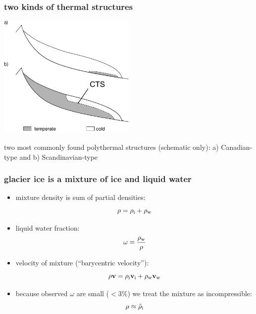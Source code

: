 \documentclass{beamer}
\begin{document}
\begin{frame}
  \frametitle{two kinds of thermal structures}

\vspace{-1cm}
  \begin{center}
    \includegraphics[width=0.5\textwidth]{structures}
  \end{center}

\scriptsize two most commonly found polythermal structures (schematic only): a) Canadian-type and b) Scandinavian-type\small

\end{frame}


\begin{frame}
  \frametitle{glacier ice is a mixture of ice and liquid water}

\begin{itemize}
\item mixture density is sum of partial densities:
\begin{equation}
  \rho = \rho_{\text i} +  \rho_{\text w}\notag
\end{equation} 
\item liquid water fraction:
\begin{equation}
  \omega = \frac{\rho_{\text w}}{\rho} \notag
\end{equation}
\item velocity of mixture (``barycentric velocity''):
\begin{equation}
  \rho \mathbf{v} = \rho_{\text i} \mathbf{v}_{\text i} + \rho_{\text w} \mathbf{v}_{\text w} \notag
\end{equation} 
\item because observed $\omega$ are small ($< 3 \%$) we treat the mixture as incompressible:
  $$\rho \approx \hat \rho_{\text i}$$
\end{itemize}
\end{frame}
\end{document}
